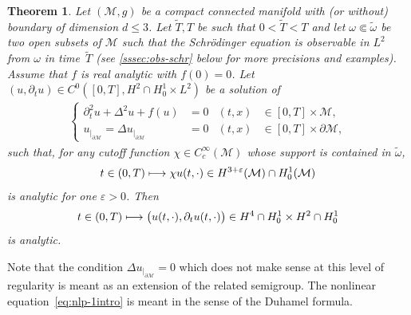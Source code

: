 \documentclass[JEP,XML,SOM,Unicode,published]{cedram}
\newcommand\mto{\mathchoice{\longmapsto}{\mapsto}{\mapsto}{\mapsto}}
\newtheorem{theorem}{Theorem}[section]
\theoremstyle{definition}
\let\mc\mathcal
\let\veps\varepsilon
\newcommand{\M}{\mc{M}}
\begin{document}
\begin{theorem}\label{thm:analytic-nlp}
Let $(\M, g)$ be a compact connected manifold with (or without) boundary of dimension $d\leq 3$. Let $\widetilde{T},T$ be such that $0<\widetilde{T}<T$ and let $\omega\Subset \widetilde{\omega}$ be two open subsets of $\M$ such that the Schrödinger equation is observable in $L^2$ from $\omega$ in time~$\widetilde{T}$ (see \cref{sssec:obs-schr} below for more precisions and examples). Assume that $f$ is real analytic with $f(0)=0$. Let $(u, \partial_t u)\in C^0([0, T], H^2\cap H_0^1\times L^2)$ be a solution of
\begin{align}\label{eq:nlp-1intro}
\left\{\begin{aligned}
\partial_t^2 u+\Delta^2 u+f(u)&=0 &(t, x)&\in [0, T]\times \M,\\
u_{|_{\partial\M}}=\Delta u_{|_{\partial\M}}&=0 &(t, x)&\in [0, T]\times\partial\M,
\end{aligned}\right.
\end{align}
such that, for any cutoff function $\chi\in C_c^\infty(\M)$ whose support is contained in $\widetilde{\omega}$,
\[
t\in (0, T)\mto \chi u(t,\cdot)\in H^{3+\veps}(\M)\cap H_0^1(\M)
\]
is analytic for one $\veps>0$. Then
\[
t\in (0, T)\mto \big(u(t, \cdot), \partial_t u(t,\cdot)\big)\in H^4\cap H_0^1\times H^2\cap H_0^1
\]
is analytic.
\end{theorem}

Note that the condition $\Delta u_{|_{\partial\M}}=0$ which does not make sense at this level of regularity is meant as an extension of the related semigroup. The nonlinear equation~\eqref{eq:nlp-1intro} is meant in the sense of the Duhamel formula.
\end{document}
